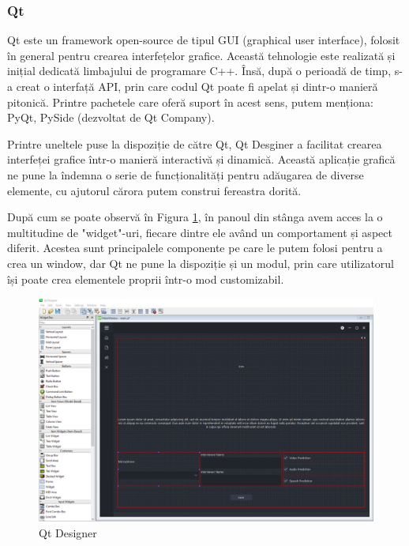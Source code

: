 \documentclass[a4paper, 12pt]{report}
\begin{document}
	\subsubsection{Qt}
 	Qt \cite{qt} este un framework open-source de tipul GUI (graphical user interface), folosit în general pentru crearea interfețelor grafice. Această tehnologie este realizată și inițial dedicată limbajului de programare C++. Însă, după o perioadă de timp, s-a creat o interfață API, prin care codul Qt poate fi apelat și dintr-o manieră pitonică. Printre pachetele care oferă suport în acest sens, putem menționa: PyQt, PySide (dezvoltat de Qt Company). 
 
 	Printre uneltele puse la dispoziție de către Qt, Qt Desginer a facilitat crearea interfeței grafice într-o manieră interactivă și 	 dinamică. Această aplicație grafică ne pune la îndemna o serie de funcționalități pentru adăugarea de diverse elemente, cu ajutorul cărora putem construi fereastra dorită. 
 	
 	După cum se poate observă în Figura \ref{fig:qt_designer}, în panoul din stânga avem acces la o multitudine de "widget"-uri, fiecare dintre ele având un comportament și aspect diferit. Acestea sunt principalele componente pe care le putem folosi pentru a crea un window, dar Qt ne pune la dispoziție și un modul, prin care utilizatorul își poate crea elementele proprii într-o mod customizabil.
	
	\begin{figure}[H]
		\begin{center}
			\includegraphics[scale=0.3]{images/qt_designer.png}
		\end{center}
		\caption{Qt Designer}
		\label{fig:qt_designer}
	\end{figure} 
\end{document}
